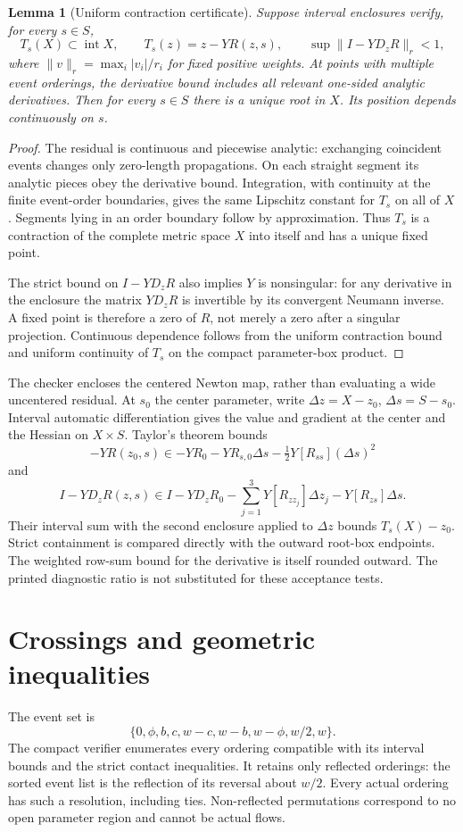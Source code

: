 \documentclass[11pt]{article}
\newtheorem{lemma}[theorem]{Lemma}
\begin{document}
\begin{lemma}[Uniform contraction certificate]\label{lem:contraction}
Suppose interval enclosures verify, for every $s\in S$,
\[
 T_s(X)\subset\operatorname{int}X,\qquad
 T_s(z)=z-YR(z,s),\qquad
 \sup\|I-YD_zR\|_r<1,
\]
where $\|v\|_r=\max_i|v_i|/r_i$ for fixed positive weights. At points with multiple event orderings, the derivative bound includes all relevant one-sided analytic derivatives. Then for every $s\in S$ there is a unique root in $X$. Its position depends continuously on $s$.
\end{lemma}
\begin{proof}
The residual is continuous and piecewise analytic: exchanging coincident events changes only zero-length propagations. On each straight segment its analytic pieces obey the derivative bound. Integration, with continuity at the finite event-order boundaries, gives the same Lipschitz constant for $T_s$ on all of $X$. Segments lying in an order boundary follow by approximation. Thus $T_s$ is a contraction of the complete metric space $X$ into itself and has a unique fixed point.

The strict bound on $I-YD_zR$ also implies $Y$ is nonsingular: for any derivative in the enclosure the matrix $YD_zR$ is invertible by its convergent Neumann inverse. A fixed point is therefore a zero of $R$, not merely a zero after a singular projection. Continuous dependence follows from the uniform contraction bound and uniform continuity of $T_s$ on the compact parameter-box product.
\end{proof}

The checker encloses the centered Newton map, rather than evaluating a wide uncentered residual. At $s_0$ the center parameter, write $\Delta z=X-z_0$, $\Delta s=S-s_0$. Interval automatic differentiation gives the value and gradient at the center and the Hessian on $X\times S$. Taylor's theorem bounds
\[
 -YR(z_0,s)\in-YR_0-YR_{s,0}\Delta s
                     -\tfrac12Y[R_{ss}](\Delta s)^2
\]
and
\[
 I-YD_zR(z,s)\in I-YD_zR_0
 -\sum_{j=1}^3Y[R_{z z_j}]\Delta z_j-Y[R_{zs}]\Delta s.
\]
Their interval sum with the second enclosure applied to $\Delta z$ bounds $T_s(X)-z_0$. Strict containment is compared directly with the outward root-box endpoints. The weighted row-sum bound for the derivative is itself rounded outward. The printed diagnostic ratio is not substituted for these acceptance tests.

\section{Crossings and geometric inequalities}
The event set is
\[
 \{0,\phi,b,c,w-c,w-b,w-\phi,w/2,w\}.
\]
The compact verifier enumerates every ordering compatible with its interval bounds and the strict contact inequalities. It retains only reflected orderings: the sorted event list is the reflection of its reversal about $w/2$. Every actual ordering has such a resolution, including ties. Non-reflected permutations correspond to no open parameter region and cannot be actual flows.
\end{document}
